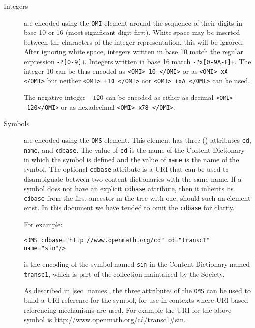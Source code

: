 \begin{description}
\item[Integers] are encoded using the
  \lstinline|OMI| element around the sequence of their
  digits in base 10 or 16 (most significant digit first).  White space
  may be inserted between the characters of the integer representation,
  this will be ignored.  After ignoring white space, integers written in
  base 10 match the regular expression
  \lstinline|-?[0-9]+|.  Integers written in base 16 match
  \lstinline|-?x[0-9A-F]+|.  The integer 10 can be thus
  encoded as \lstinline|<OMI> 10 </OMI>| or as
  \lstinline|<OMI> xA </OMI>| but neither
  \lstinline|<OMI> +10 </OMI>| nor
  \lstinline|<OMI> +xA </OMI>| can be used.

  The negative integer $-120$ can be encoded
  as either as decimal \lstinline|<OMI> -120</OMI>| or as hexadecimal 
  \lstinline|<OMI>-x78 </OMI>|.
\item[Symbols] are encoded using the \lstinline|OMS| element. This element has three
  (\XML) attributes \lstinline|cd|, \lstinline|name|, and \lstinline|cdbase|. The value
  of \lstinline|cd| is the name of the Content Dictionary in which the symbol is defined
  and the value of \lstinline|name| is the name of the symbol.  The optional
  \lstinline|cdbase| attribute is a URI that can be used to disambiguate between two
  content dictionaries with the same name.  If a symbol does not have an explicit
  \lstinline|cdbase| attribute, then it inherits its \lstinline|cdbase| from the first
  ancestor in the \XML tree with one, should such an element exist.  In this document we
  have tended to omit the \lstinline|cdbase| for clarity.
  
  For example:
\begin{lstlisting}
<OMS cdbase="http://www.openmath.org/cd" cd="transc1" name="sin"/>
\end{lstlisting}
  is the encoding of the symbol named \lstinline|sin| in the Content Dictionary named
  \lstinline|transc1|, which is part of the collection maintained by the \OM Society.

  As described in \ref{sec_names}, the three attributes of the \lstinline|OMS| can be used
  to build a URI reference for the symbol, for use in contexts where URI-based referencing
  mechanisms are used.  For example the URI for the above symbol is
  \url{http://www.openmath.org/cd/transc1\#sin}.


\end{description}
